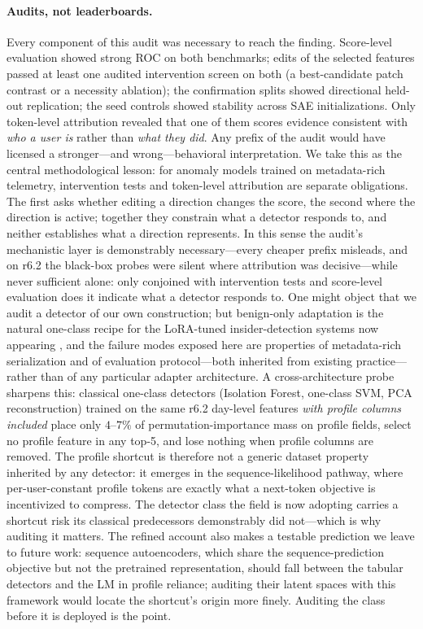 \documentclass[10pt]{article} %
\newcommand{\rsix}{r6.2}
\begin{document}
\paragraph{Audits, not leaderboards.}
Every component of this audit was necessary to reach the finding. Score-level
evaluation showed strong ROC on both benchmarks; edits of the selected
features passed at least one audited intervention screen on both (a
best-candidate patch contrast or a necessity ablation);
the confirmation splits showed
directional held-out replication; the seed controls showed stability across
SAE initializations. Only token-level attribution revealed that one of
them scores evidence consistent with \emph{who a user is} rather than
\emph{what they did}. Any prefix of the audit
would have licensed a stronger---and wrong---behavioral interpretation. We
take this as the central methodological lesson: for anomaly models trained on
metadata-rich telemetry, intervention tests and token-level attribution are
separate obligations. The first asks whether editing a direction changes the
score, the second where the direction is active; together they constrain
what a detector responds to, and neither establishes what a direction
represents. In this sense the audit's mechanistic layer is demonstrably
necessary---every cheaper prefix misleads, and on \rsix{} the black-box
probes were silent where attribution was decisive---while never sufficient
alone: only conjoined with intervention tests and score-level evaluation
does it indicate what a detector responds to. One might object that we audit a
detector of our own construction; but benign-only adaptation is the natural
one-class recipe for the LoRA-tuned insider-detection systems now appearing
\citep{song2025dmfi}, and the failure modes exposed here are properties of
metadata-rich serialization and of evaluation protocol---both inherited
from existing practice---rather than of any particular adapter
architecture. A cross-architecture probe sharpens this: classical
one-class detectors (Isolation Forest, one-class SVM, PCA reconstruction)
trained on the same \rsix{} day-level features \emph{with profile columns
included} place only $4$--$7\%$ of permutation-importance mass on profile
fields, select no profile feature in any top-5, and lose nothing when
profile columns are removed. The profile shortcut is therefore not a
generic dataset property inherited by any detector: it emerges in the
sequence-likelihood pathway, where per-user-constant profile tokens are
exactly what a next-token objective is incentivized to compress. The
detector class the field is now adopting carries a shortcut risk its
classical predecessors demonstrably did not---which is why auditing it
matters. The refined account also makes a testable prediction we leave to
future work: sequence autoencoders, which share the sequence-prediction
objective but not the pretrained representation, should fall between the
tabular detectors and the LM in profile reliance; auditing their latent
spaces with this framework would locate the shortcut's origin more finely.
Auditing the class before it is deployed is the point.
\end{document}
